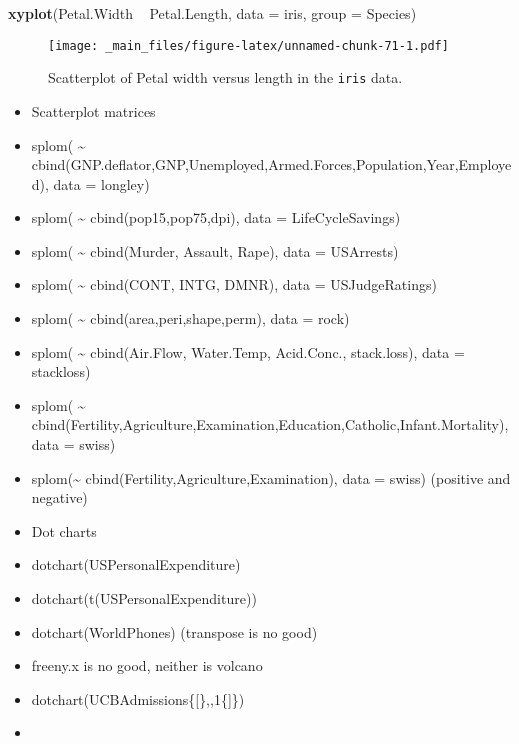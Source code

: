 \documentclass[]{book}
\newenvironment{Shaded}{\begin{snugshade}}{\end{snugshade}}
\newcommand{\KeywordTok}[1]{\textcolor[rgb]{0.13,0.29,0.53}{\textbf{{#1}}}}
\newcommand{\DataTypeTok}[1]{\textcolor[rgb]{0.13,0.29,0.53}{{#1}}}
\newcommand{\StringTok}[1]{\textcolor[rgb]{0.31,0.60,0.02}{{#1}}}
\newcommand{\NormalTok}[1]{{#1}}
\numberwithin{equation}{chapter}
\numberwithin{figure}{chapter}
\theoremstyle{plain}
\theoremstyle{definition}
\theoremstyle{remark}
\theoremstyle{definition}
\theoremstyle{definition}
\theoremstyle{remark}
\begin{document}
\begin{Shaded}
\begin{Highlighting}[]
\KeywordTok{xyplot}\NormalTok{(Petal.Width ~}\StringTok{ }\NormalTok{Petal.Length, }\DataTypeTok{data =} \NormalTok{iris, }\DataTypeTok{group =} \NormalTok{Species)}
\end{Highlighting}
\end{Shaded}

\begin{figure}[htbp]
\centering
\texttt{[image: \_main\_files/figure-latex/unnamed-chunk-71-1.pdf]}
\caption{\label{fig:unnamed-chunk-71}\small Scatterplot of Petal width versus length in the
\texttt{iris} data.}
\end{figure}




\begin{itemize}
\item
  Scatterplot matrices
\item
  splom( \textasciitilde{}
  cbind(GNP.deflator,GNP,Unemployed,Armed.Forces,Population,Year,Employed),
  data = longley)
\item
  splom( \textasciitilde{} cbind(pop15,pop75,dpi), data =
  LifeCycleSavings)
\item
  splom( \textasciitilde{} cbind(Murder, Assault, Rape), data =
  USArrests)
\item
  splom( \textasciitilde{} cbind(CONT, INTG, DMNR), data =
  USJudgeRatings)
\item
  splom( \textasciitilde{} cbind(area,peri,shape,perm), data = rock)
\item
  splom( \textasciitilde{} cbind(Air.Flow, Water.Temp, Acid.Conc.,
  stack.loss), data = stackloss)
\item
  splom( \textasciitilde{}
  cbind(Fertility,Agriculture,Examination,Education,Catholic,Infant.Mortality),
  data = swiss)
\item
  splom(\textasciitilde{} cbind(Fertility,Agriculture,Examination), data
  = swiss) (positive and negative)
\item
  Dot charts
\item
  dotchart(USPersonalExpenditure)
\item
  dotchart(t(USPersonalExpenditure))
\item
  dotchart(WorldPhones) (transpose is no good)
\item
  freeny.x is no good, neither is volcano
\item
  dotchart(UCBAdmissions\{{[}\},,1\{{]}\})
\item

\end{itemize}
\end{document}
